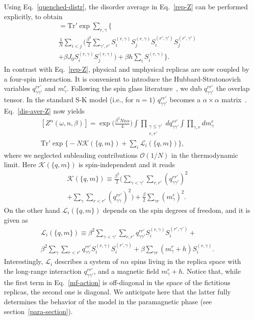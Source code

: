 \documentclass[twocolumn,superscriptaddress,prb,10pt]{revtex4-1}
\def\tr{\textrm{Tr}}
\begin{document}
Using Eq.~\eqref{quenched-distr}, the disorder average in Eq.~\eqref{rep-Z} 
can be performed explicitly, to obtain 
%
\begin{multline}
[Z^\alpha(\omega,n,\beta)]=\tr'\exp\sum\limits_{r,\gamma}\Big\{\\
\frac{1}{N}
\sum\limits_{i<j}\Big(
\frac{\beta^2}{2}\sum\limits_{\gamma',r'}S^{(r,\gamma)}_iS^{(r,\gamma)}_j
S^{(r',\gamma')}_iS^{(r',\gamma')}_j\\
+\beta J_0 S_i^{(r,\gamma)}S_j^{(r,\gamma)}\Big)
+\beta h\sum\limits_{i}
S_i^{(r,\gamma)}\Big\}.
\label{dis-aver-Z}
\end{multline}
%
In contrast with Eq.~\eqref{rep-Z}, physical and unphysical replicas are 
now coupled by a four-spin interaction. It is convenient to introduce the  
Hubbard-Stratonovich variables $q_{\gamma\gamma'}^{rr'}$ and $m_\gamma^r$. 
Following the spin glass literature~\cite{parisi-book}, we dub $q_{\gamma
\gamma'}^{rr'}$ the overlap tensor. In the standard S-K model (i.e., for $n=1$) 
$q_{\gamma\gamma'}^{rr'}$ becomes a $\alpha\times\alpha$ 
matrix~\cite{sherrington-1978-prl}. Eq.~\eqref{dis-aver-Z} now 
yields  
%
\begin{multline}
\label{hs-Z}
[Z^\alpha(\omega,n,\beta)]=\exp\Big(\frac{\beta^2Nn\alpha}{4}\Big)
\int\prod_{\substack{\gamma\le\gamma'\\r,r'}}
dq^{rr'}_{\gamma\gamma'}
\int\prod_{\gamma,r}dm_\gamma^r\\
\tr'\exp
\Big\{-N {\mathcal K}(\{q,m\})
+\sum_i{\mathcal L}_i(\{q,m\})\Big\},
\end{multline}
%
where we neglected subleading contributions ${\mathcal O}(1/N)$ in 
the thermodynamic limit. Here ${\mathcal K}(\{q,m\})$ is spin-independent 
and it reads 
%
\begin{multline}
{\mathcal K}(\{q,m\})\equiv 
\frac{\beta^2}{2}\Big(\sum\limits_{\gamma<\gamma'}\sum
\limits_{r,r'} (q_{\gamma\gamma'}^{rr'})^2
\\
+\sum\limits_{\gamma}\sum\limits_{r<r'}(q_{\gamma\gamma}^{
rr'})^2\Big)
+\frac{\beta}{2}\sum\limits_{\gamma r}(m_\gamma^r)^2. 
\label{Gamma}
\end{multline}
%
On the other hand ${\mathcal L}_i(\{q,m\})$ depends on the spin degrees of 
freedom, and it is given as   
%
\begin{multline}
{\mathcal L}_i(\{q,m\})
\equiv\beta^2\sum\limits_{\gamma<\gamma'}\sum\limits_{r,r'}
q_{\gamma\gamma'}^{rr'}S_i^{(r,\gamma)}
S_i^{(r',\gamma')}+\\
\beta^2\sum_\gamma\sum\limits_{r<r'}
q_{\gamma\gamma}^{rr'}S^{(r,\gamma)}_i
S^{(r',\gamma)}_i
+\beta\sum\limits_{\gamma r}(m_\gamma^r+h)
S_i^{(r,\gamma)}.
\label{mf-action}
\end{multline}
%
Interestingly, ${\mathcal L}_i$ describes a system of $n\alpha$ spins living 
in the replica space with the long-range interaction $q_{\gamma\gamma'}^{rr'}$, 
and a magnetic field $m_\gamma^r+h$. Notice that, while the first term in 
Eq.~\eqref{mf-action} is off-diagonal in the space of the fictitious replicas, 
the second one is diagonal. We anticipate here that the latter fully determines the 
behavior of the model in the paramagnetic phase (see section~\ref{para-section}). 
\end{document}
